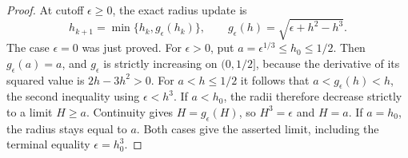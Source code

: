 \begin{proof}
At cutoff $\epsilon\ge0$, the exact radius update is
\[
  h_{k+1}=\min\{h_k,g_\epsilon(h_k)\},\qquad
  g_\epsilon(h)=\sqrt{\epsilon+h^2-h^3}.
\]
The case $\epsilon=0$ was just proved. For $\epsilon>0$, put
$a=\epsilon^{1/3}\le h_0\le1/2$. Then $g_\epsilon(a)=a$, and
$g_\epsilon$ is strictly increasing on $(0,1/2]$, because the derivative
of its squared value is $2h-3h^2>0$. For $a<h\le1/2$ it follows that
$a<g_\epsilon(h)<h$, the second inequality using $\epsilon<h^3$.
If $a<h_0$, the radii therefore decrease strictly to a limit $H\ge a$.
Continuity gives $H=g_\epsilon(H)$, so $H^3=\epsilon$ and $H=a$.
If $a=h_0$, the radius stays equal to $a$. Both cases give the asserted
limit, including the terminal equality $\epsilon=h_0^3$.
\end{proof}
